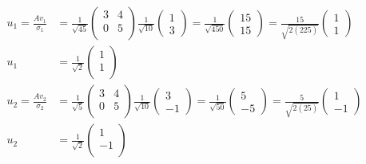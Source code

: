 \documentclass{article}
\begin{document}
\begin{align*}
    u_1=\frac{Av_1}{\sigma_1} & =\frac{1}{\sqrt{45}}\begin{pmatrix}3&4\\0&5\\\end{pmatrix}\frac{1}{\sqrt{10}}\begin{pmatrix}1\\3\end{pmatrix}=\frac{1}{\sqrt{450}}\begin{pmatrix}15\\15\end{pmatrix}=\frac{15}{\sqrt{2(225)}}\begin{pmatrix}1\\1\end{pmatrix} \\
    u_1                       & =\frac{1}{\sqrt{2}}\begin{pmatrix}1\\1\\\end{pmatrix}                                                                                                                                                 \\
    u_2=\frac{Av_2}{\sigma_2} & =\frac{1}{\sqrt{5}}\begin{pmatrix}3&4\\0&5\\\end{pmatrix}\frac{1}{\sqrt{10}}\begin{pmatrix}3\\-1\end{pmatrix}=\frac{1}{\sqrt{50}}\begin{pmatrix}5\\-5\end{pmatrix}=\frac{5}{\sqrt{2(25)}}\begin{pmatrix}1\\-1\end{pmatrix}     \\
    u_2                       & =\frac{1}{\sqrt{2}}\begin{pmatrix}1\\-1\\\end{pmatrix}                                                                                                                                                 \\
\end{align*}
\end{document}
